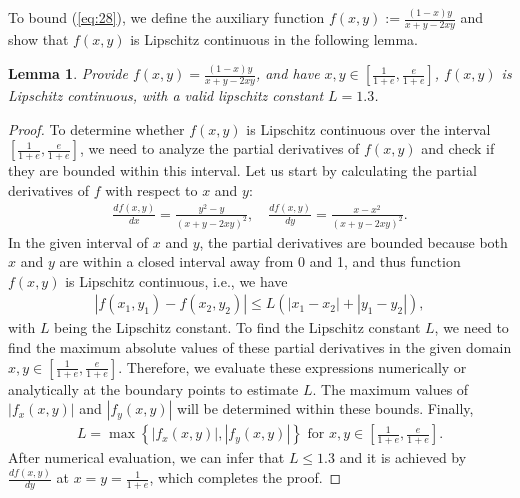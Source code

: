 \documentclass{article} %
\def\eqref#1{equation~\ref{#1}}
\newtheorem{lemma}{Lemma}
\renewcommand{\eqref}[1]{(\ref{#1})}
\begin{document}
{To bound \eqref{eq:28}, we define the auxiliary function $f(x,y):=\frac{(1-x)y}{x+y-2xy}$ and show that $f(x,y)$ is Lipschitz continuous in the following lemma.

\begin{lemma}\label{lemma:lipschitz}
Provide $f(x,y)=\frac{(1-x)y}{x+y-2xy}$, and have $x, y\in \left[\frac{1}{1+e}, \frac{e}{1+e}\right]$, $f(x,y)$ is Lipschitz continuous, with a valid lipschitz constant $L=1.3$. 
\end{lemma}

\begin{proof}
To determine whether $f(x,y)$ is Lipschitz continuous over the interval $\left[\frac{1}{1+e}, \frac{e}{1+e}\right]$, we need to analyze the partial derivatives of $f(x,y)$ and check if they are bounded within this interval. 
Let us start by calculating the partial derivatives of $f$ with respect to $x$ and $y$: 
\begin{align}
    \frac{df(x,y)}{dx}=\frac{y^2-y}{(x+y-2xy)^2},\quad \frac{df(x,y)}{dy}=\frac{x-x^2}{(x+y-2xy)^2}.
\end{align}
In the given interval of $x$ and $y$, the partial derivatives are bounded because both \( x \) and \( y \) are within a closed interval away from 0 and 1, and thus function $f(x,y)$ is Lipschitz continuous, i.e., we have
\begin{align}
    |f(x_1, y_1)-f(x_2, y_2)|\leq L(|x_1-x_2|+|y_1-y_2|),
\end{align}
with $L$ being the Lipschitz constant. To find the Lipschitz constant $L$, we need to find the maximum absolute values of these partial derivatives in the given domain \( x, y \in \left[\frac{1}{1+e}, \frac{e}{1+e}\right] \).
Therefore, we evaluate these expressions numerically or analytically at the boundary points to estimate \( L \).
The maximum values of \( \left| f_x(x,y) \right| \) and \( \left| f_y(x,y) \right| \) will be determined within these bounds.
Finally,
\begin{align}
    L = \max \left\{ \left| f_x(x,y) \right|, \left| f_y(x,y) \right| \right\} \text{ for } x, y \in \left[\frac{1}{1+e}, \frac{e}{1+e}\right].
\end{align}
After numerical evaluation, we can infer that $L\leq 1.3$ and it is achieved by $\frac{df(x,y)}{dy}$ at $x=y=\frac{1}{1+e}$, which completes the proof.
\end{proof}

}
\end{document}
